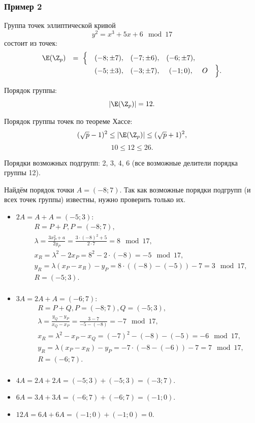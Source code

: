 
\subsubsection{Пример 2}

Группа точек эллиптической кривой
    \[ y^2 = x^3 + 5 x + 6 \mod 17 \]
состоит из точек:
\[ \begin{array}{ccccccc}
    \E(\Z_p) & =~ \Big\{ & (-8; \pm 7), & (-7; \pm 6), & (-6; \pm 7), &   & \\
             &           & (-5; \pm 3), & (-3; \pm 7), & (-1; 0),     & O & \Big\}. \\
\end{array} \]

Порядок группы:
    \[ |\E(\Z_p)| = 12. \]

Порядок группы точек по теореме Хассе:
    \[ (\sqrt{p}-1)^2 \leq |\E(\Z_p)| \leq (\sqrt{p}+1)^2, \]
    \[ 10 \leq 12 \leq 26. \]

Порядки возможных подгрупп: 2, 3, 4, 6 (все возможные делители порядка группы 12).

Найдём порядок точки $A = (-8; 7)$. Так как возможные порядки подгрупп (и всех точек группы) известны, нужно проверить только их.

\begin{itemize}
\item $2A = A + A = (-5; 3)$:
\[\begin{aligned}
& R = P + P, P = (-8; 7), \\
& \lambda = \frac{3 x_P^2 + a}{2y_P} = \frac{3 \cdot (-8)^2 + 5}{2 \cdot 7} = 8 \mod 17, \\
& x_R = \lambda^2 - 2x_P = 8^2 - 2 \cdot (-8) = -5 \mod 17, \\
& y_R = \lambda (x_P - x_R) - y_P = 8 \cdot ((-8) - (-5)) - 7 = 3 \mod 17, \\
& R = (-5; 3). \\
\end{aligned}\]

\item $3A = 2A + A = (-6; 7)$:
\[\begin{aligned}
& R = P + Q, P = (-8; 7), Q = (-5; 3), \\
& \lambda = \frac{y_Q - y_P}{x_Q - x_P} = \frac{3 - 7}{-5 - (-8)} = -7 \mod 17, \\
& x_R = \lambda^2 - x_P - x_Q = (-7)^2 - (-8) - (-5) = -6 \mod 17, \\
& y_R = \lambda (x_P - x_R) - y_P = -7 \cdot (-8 - (-6)) - 7 = 7 \mod 17, \\
& R = (-6; 7). \\
\end{aligned}\]

\item $4A = 2A + 2A = (-5; 3) + (-5; 3) = (-3; 7)$.

\item $6A = 3A + 3A = (-6; 7) + (-6; 7) = (-1; 0)$.

\item $12A = 6A + 6A = (-1; 0) + (-1; 0) = 0$.

\end{itemize}

